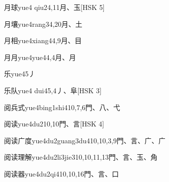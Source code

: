 \begin{entry}{月球}{yue4 qiu2}{4,11}{⽉、⽟}[HSK 5]
\end{entry}

\begin{entry}{月壤}{yue4rang3}{4,20}{⽉、⼟}
\end{entry}

\begin{entry}{月相}{yue4xiang4}{4,9}{⽉、⽬}
\end{entry}

\begin{entry}{月月}{yue4yue4}{4,4}{⽉、⽉}
\end{entry}

\begin{entry}{乐}{yue4}{5}{⼃}
\end{entry}

\begin{entry}{乐队}{yue4 dui4}{5,4}{⼃、⾩}[HSK 3]
\end{entry}

\begin{entry}{阅兵式}{yue4bing1shi4}{10,7,6}{⾨、⼋、⼷}
\end{entry}

\begin{entry}{阅读}{yue4du2}{10,10}{⾨、⾔}[HSK 4]
\end{entry}

\begin{entry}{阅读广度}{yue4du2guang3du4}{10,10,3,9}{⾨、⾔、⼴、⼴}
\end{entry}

\begin{entry}{阅读理解}{yue4du2li3jie3}{10,10,11,13}{⾨、⾔、⽟、⾓}
\end{entry}

\begin{entry}{阅读器}{yue4du2qi4}{10,10,16}{⾨、⾔、⼝}
\end{entry}

